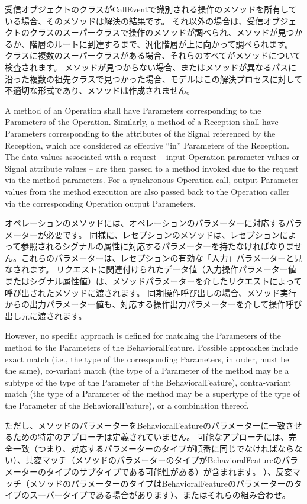 \documentclass[a4paper,11pt]{ltjsarticle}
\begin{document}
受信オブジェクトのクラスがCallEventで識別される操作のメソッドを所有している場合、そのメソッドは解決の結果です。
それ以外の場合は、受信オブジェクトのクラスのスーパークラスで操作のメソッドが調べられ、メソッドが見つかるか、階層のルートに到達するまで、汎化階層が上に向かって調べられます。
クラスに複数のスーパークラスがある場合、それらのすべてがメソッドについて検査されます。
メソッドが見つからない場合、またはメソッドが異なるパスに沿った複数の祖先クラスで見つかった場合、モデルはこの解決プロセスに対して不適切な形式であり、メソッドは作成されません。

A method of an Operation shall have Parameters corresponding to the Parameters of the Operation. 
Similarly, a method of a Reception shall have Parameters corresponding to the attributes of the Signal referenced by the Reception, which are considered as effective “in” Parameters of the Reception. 
The data values associated with a request – input Operation parameter values or Signal attribute values – are then passed to a method invoked due to the request via the method parameters. 
For a synchronous Operation call, output Parameter values from the method execution are also passed back to the Operation caller via the corresponding Operation output Parameters.

オペレーションのメソッドには、オペレーションのパラメーターに対応するパラメーターが必要です。
同様に、レセプションのメソッドは、レセプションによって参照されるシグナルの属性に対応するパラメーターを持たなければなりません。これらのパラメーターは、レセプションの有効な「入力」パラメーターと見なされます。
リクエストに関連付けられたデータ値（入力操作パラメーター値またはシグナル属性値）は、メソッドパラメーターを介したリクエストによって呼び出されたメソッドに渡されます。
同期操作呼び出しの場合、メソッド実行からの出力パラメーター値も、対応する操作出力パラメーターを介して操作呼び出し元に渡されます。

However, no specific approach is defined for matching the Parameters of the method to the Parameters of the BehavioralFeature. 
Possible approaches include exact match (i.e., the type of the corresponding Parameters, in order, must be the same), co-variant match (the type of a Parameter of the method may be a subtype of the type of the Parameter of the BehavioralFeature), contra-variant match (the type of a Parameter of the method may be a supertype of the type of the Parameter of the BehavioralFeature), or a combination thereof.

ただし、メソッドのパラメーターをBehavioralFeatureのパラメーターに一致させるための特定のアプローチは定義されていません。
可能なアプローチには、完全一致（つまり、対応するパラメーターのタイプが順番に同じでなければならない）、共変マッチ（メソッドのパラメーターのタイプがBehavioralFeatureのパラメーターのタイプのサブタイプである可能性がある）が含まれます。 ）、反変マッチ（メソッドのパラメーターのタイプはBehavioralFeatureのパラメーターのタイプのスーパータイプである場合があります）、またはそれらの組み合わせ。
\end{document}

